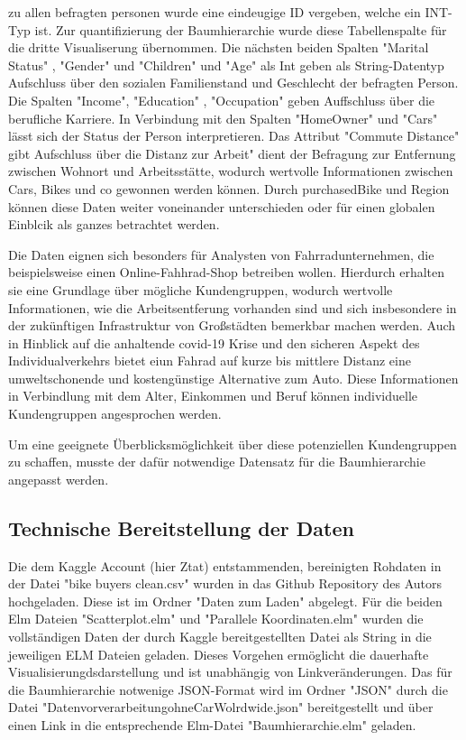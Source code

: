 \documentclass[usegeometry=true]{scrartcl}
\begin{document}
zu allen befragten personen wurde eine eindeugige ID vergeben, welche ein INT-Typ ist. Zur quantifizierung der Baumhierarchie wurde diese Tabellenspalte für die dritte Visualiserung übernommen. Die nächsten beiden Spalten "Marital Status" , "Gender" und "Children" und "Age" als Int geben als String-Datentyp Aufschluss über den sozialen  Familienstand und Geschlecht der befragten Person. Die Spalten "Income", "Education" , "Occupation" geben Auffschluss über die berufliche Karriere. In Verbindung mit den Spalten "HomeOwner" und "Cars" lässt sich der Status der Person interpretieren. Das Attribut "Commute Distance" gibt Aufschluss über die Distanz zur Arbeit" dient der Befragung zur Entfernung zwischen Wohnort und Arbeitsstätte, wodurch wertvolle Informationen zwischen Cars, Bikes und co gewonnen werden können. Durch purchasedBike und Region können diese Daten weiter voneinander unterschieden oder für einen globalen Einblcik als ganzes betrachtet werden. 

Die Daten eignen sich besonders für Analysten von Fahrradunternehmen, die beispielsweise einen Online-Fahhrad-Shop betreiben wollen. Hierdurch erhalten sie eine Grundlage über mögliche Kundengruppen, wodurch wertvolle Informationen, wie die Arbeitsentferung vorhanden sind und sich insbesondere in der zukünftigen Infrastruktur von Großstädten bemerkbar machen werden. Auch in Hinblick auf die anhaltende covid-19 Krise und den sicheren Aspekt des Individualverkehrs bietet eiun Fahrad auf kurze bis mittlere Distanz eine umweltschonende und kostengünstige Alternative zum Auto. 
Diese Informationen in Verbindlung mit dem Alter, Einkommen und Beruf können individuelle Kundengruppen angesprochen werden. 

Um eine geeignete Überblicksmöglichkeit über diese potenziellen Kundengruppen zu schaffen, musste der dafür notwendige Datensatz für die Baumhierarchie angepasst werden. 

\subsection{Technische Bereitstellung der Daten}


Die dem Kaggle Account (hier Ztat) entstammenden, bereinigten Rohdaten in der Datei "bike buyers clean.csv" wurden in das Github Repository des Autors hochgeladen. Diese ist im Ordner "Daten zum Laden" abgelegt. Für die beiden Elm Dateien "Scatterplot.elm" und "Parallele Koordinaten.elm" wurden die vollständigen Daten der durch Kaggle bereitgestellten Datei als String in die jeweiligen ELM Dateien geladen. Dieses Vorgehen ermöglicht die dauerhafte Visualisierungdsdarstellung und ist unabhängig von Linkveränderungen. Das für die Baumhierarchie notwenige JSON-Format wird im Ordner "JSON" durch die Datei "DatenvorverarbeitungohneCarWolrdwide.json" bereitgestellt und über einen Link in die entsprechende Elm-Datei "Baumhierarchie.elm" geladen. 
\end{document}
